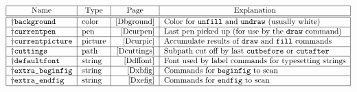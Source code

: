 \begin{table}[htp]
\caption{Other Predefined Variables}
$$\begin{tabular}{|l|l|r|l|}
\hline
\multicolumn1{|c}{Name}&  \multicolumn1{|c}{Type}&  \multicolumn1{|c}{Page}&
        \multicolumn1{|c|}{Explanation}\\
\hline
\hline
\pl\tt  background&     color&  \pageref{Dbground}&
        Color for {\tt unfill} and {\tt undraw} (usually white)\\\hline
\pl\tt  currentpen&     pen&    \pageref{Dcurpen}&
        Last pen picked up (for use by the {\tt draw} command)\\\hline
\pl\tt  currentpicture& picture&        \pageref{Dcurpic}&
        Accumulate results of {\tt draw} and {\tt fill} commands\\\hline
\pl\tt  cuttings&       path&   \pageref{Dcuttings}&
        Subpath cut off by last {\tt cutbefore} or {\tt cutafter}\\\hline
\pl\tt  defaultfont&    string& \pageref{Ddffont}&
        Font used by label commands for typesetting strings\\\hline
\pl\tt  extra\_beginfig&        string& \pageref{Dxbfig}&
        Commands for {\tt beginfig} to scan\\\hline
\pl\tt  extra\_endfig&  string& \pageref{Dxefig}&
        Commands for {\tt endfig} to scan\\\hline
\end{tabular}
$$
\label{pvartab}
\end{table}


